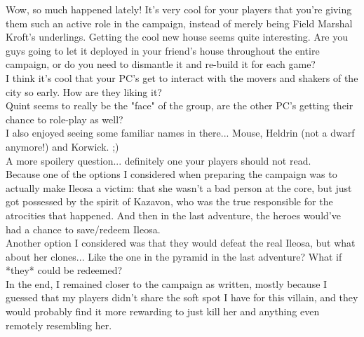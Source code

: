 Wow, so much happened lately! It's very cool for your players that you're giving them such an active role in the campaign, instead of merely being Field Marshal Kroft's underlings. Getting the cool new house seems quite interesting. Are you guys going to let it deployed in your friend's house throughout the entire campaign, or do you need to dismantle it and re-build it for each game?\\

I think it's cool that your PC's get to interact with the movers and shakers of the city so early. How are they liking it?\\

Quint seems to really be the "face" of the group, are the other PC's getting their chance to role-play as well?\\

I also enjoyed seeing some familiar names in there... Mouse, Heldrin (not a dwarf anymore!) and Korwick. ;)\\

A more spoilery question... definitely one your players should not read.\\

 Because one of the options I considered when preparing the campaign was to actually make Ileosa a victim: that she wasn't a bad person at the core, but just got possessed by the spirit of Kazavon, who was the true responsible for the atrocities that happened. And then in the last adventure, the heroes would've had a chance to save/redeem Ileosa.\\

Another option I considered was that they would defeat the real Ileosa, but what about her clones... Like the one in the pyramid in the last adventure? What if *they* could be redeemed?\\

In the end, I remained closer to the campaign as written, mostly because I guessed that my players didn't share the soft spot I have for this villain, and they would probably find it more rewarding to just kill her and anything even remotely resembling her.\\

